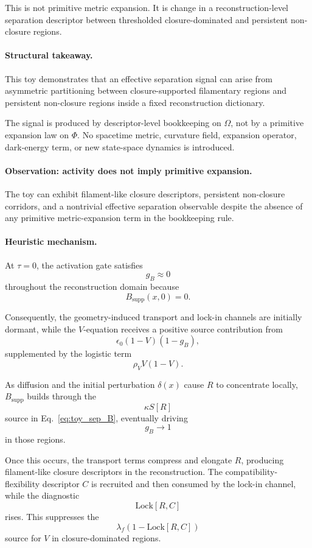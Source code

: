\documentclass[aps,prx,onecolumn,11pt]{revtex4-2}
\theoremstyle{plain}
\theoremstyle{definition}
\theoremstyle{remark}
\begin{document}
This is not primitive metric expansion. It is change in a
reconstruction-level separation descriptor between thresholded
closure-dominated and persistent non-closure regions.

\paragraph{Structural takeaway.}

This toy demonstrates that an effective separation signal can arise
from asymmetric partitioning between closure-supported filamentary
regions and persistent non-closure regions inside a fixed
reconstruction dictionary.

The signal is produced by descriptor-level bookkeeping on \(\Omega\),
not by a primitive expansion law on \(\Phi\). No spacetime metric,
curvature field, expansion operator, dark-energy term, or new
state-space dynamics is introduced.

\paragraph{Observation: activity does not imply primitive expansion.}

The toy can exhibit filament-like closure descriptors, persistent
non-closure corridors, and a nontrivial effective separation observable
despite the absence of any primitive metric-expansion term in the
bookkeeping rule.

\paragraph{Heuristic mechanism.}

At \(\tau=0\), the activation gate satisfies
\[
g_B\approx 0
\]
throughout the reconstruction domain because
\[
B_{\mathrm{supp}}(x,0)=0.
\]

Consequently, the geometry-induced transport and lock-in channels are
initially dormant, while the \(V\)-equation receives a positive source
contribution from
\[
\epsilon_0(1-V)(1-g_B),
\]
supplemented by the logistic term
\[
\rho_V V(1-V).
\]

As diffusion and the initial perturbation \(\delta(x)\) cause \(R\) to
concentrate locally, \(B_{\mathrm{supp}}\) builds through the
\[
\kappa S[R]
\]
source in Eq.~\eqref{eq:toy_sep_B}, eventually driving
\[
g_B\to 1
\]
in those regions.

Once this occurs, the transport terms compress and elongate \(R\),
producing filament-like closure descriptors in the reconstruction.
The compatibility-flexibility descriptor \(C\) is recruited and then
consumed by the lock-in channel, while the diagnostic
\[
\mathrm{Lock}[R,C]
\]
rises. This suppresses the
\[
\lambda_f(1-\mathrm{Lock}[R,C])
\]
source for \(V\) in closure-dominated regions.
\end{document}

